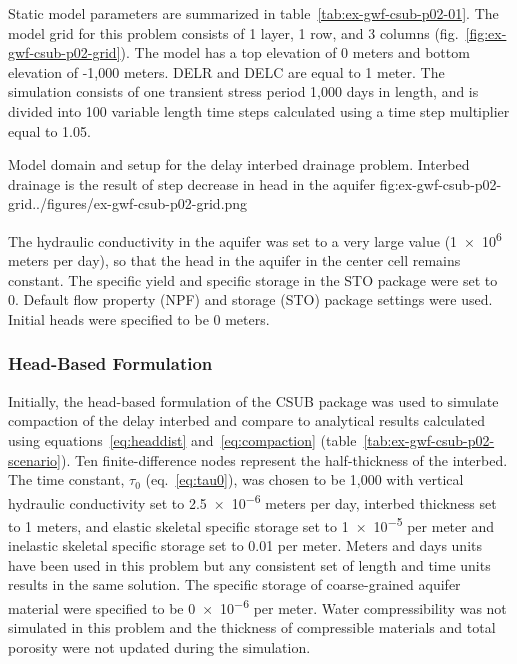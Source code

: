 Static model parameters are summarized in table~\ref{tab:ex-gwf-csub-p02-01}. The model grid for this problem consists of 1 layer, 1 row, and 3 columns (fig.~\ref{fig:ex-gwf-csub-p02-grid}). The model has a top elevation of 0 meters and bottom elevation of -1,000 meters.  DELR and DELC are equal to 1 meter. The simulation consists of one transient stress period 1,000 days in length, and is divided into 100 variable length time steps calculated using a time step multiplier equal to 1.05.



\begin{StandardFigure}{
                                     Model domain and setup for the delay interbed drainage problem. Interbed 
                                     drainage is the result of step decrease in head in the aquifer
                                     }{fig:ex-gwf-csub-p02-grid}{../figures/ex-gwf-csub-p02-grid.png}
\end{StandardFigure}                                 

The hydraulic conductivity in the aquifer was set to a very large value (\num{1e6} meters per day), so that the head in the aquifer in the center cell remains constant. The specific yield and specific storage in the STO package were set to 0. Default flow property (NPF) and storage (STO) package settings were used. Initial heads were specified to be 0 meters.

\subsubsection{Head-Based Formulation}
 
Initially, the head-based formulation of the CSUB package was used to simulate compaction of the delay interbed and compare to analytical results calculated using equations~\ref{eq:headdist} and~\ref{eq:compaction} (table~\ref{tab:ex-gwf-csub-p02-scenario}). Ten finite-difference nodes represent the half-thickness of the interbed. The time constant, $\tau_0$ (eq.~\ref{eq:tau0}), was chosen to be 1,000 with vertical hydraulic conductivity set to \num{2.5e-6} meters per day, interbed thickness set to 1 meters, and elastic skeletal specific storage set to \num{1e-5} per meter and inelastic skeletal specific storage set to 0.01 per meter. Meters and days units have been used in this problem but any consistent set of length and time units results in the same solution. The specific storage of coarse-grained aquifer material were specified to be \num{0e-6} per meter. Water compressibility was not simulated in this problem and the thickness of compressible materials and total porosity were not updated during the simulation. 

